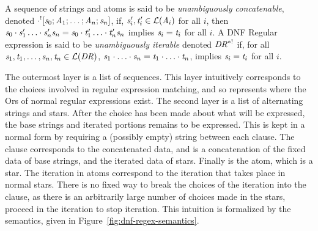\documentclass[numbers]{sigplanconf}
\begin{document}
A sequence of strings and atoms is said to be \textit{unambiguously concatenable},
denoted $\cdot^![\mathit{s}_0;\mathit{A}_1;\ldots;\mathit{A}_n;\mathit{s}_n]$,
if, $\mathit{s}_i',\mathit{t}_i'\in\mathcal{L}(\mathit{A}_i)$ for all $i$, then
$\mathit{s}_0\cdot\mathit{s}_1'\ldots\cdot\mathit{s}_n'\mathit{s}_n=
\mathit{s}_0\cdot\mathit{t}_1'\ldots\cdot\mathit{t}_n'\mathit{s}_n$
implies $\mathit{s}_i=\mathit{t}_i$ for all $i$.  A DNF Regular expression is said
to be \textit{unambiguously iterable} denoted $\mathit{DR}^{*!}$ if, for
all
$\mathit{s}_1,\mathit{t}_1,\ldots,\mathit{s}_n,\mathit{t}_n\in\mathcal{L}(\mathit{DR})$,
$\mathit{s}_1\cdot\ldots\cdot\mathit{s}_n=\mathit{t}_1\cdot\ldots\cdot\mathit{t}_n$,
implies $\mathit{s}_i=\mathit{t}_i$ for all $i$.

The outermost layer is a list of sequences.
This layer intuitively corresponds to the choices involved in regular expression matching, and so represents where the Ors of normal regular expressions exist.
The second layer is a list of alternating strings and stars.
After the choice has been made about what will be expressed,
the base strings and iterated portions remains to be expressed.
This is kept in a normal form by requiring a (possibly empty) string between
each clause.
The clause corresponds to the concatenated data, and is a concatenation of the
fixed data of base strings, and the iterated data of stars.
Finally is the atom, which is a star.
The iteration in atoms correspond to the iteration that takes place in normal stars.
There is no fixed way to break the choices of the iteration into the clause,
as there is an arbitrarily large number of choices made in the stars, proceed
in the iteration to stop iteration.
This intuition is formalized by the semantics, given in
Figure~\ref{fig:dnf-regex-semantics}.
\end{document}
